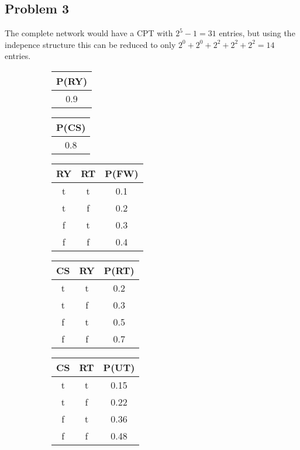 \documentclass[12pt, letterpaper]{article}
\begin{document}
\subsection{Problem 3}

The complete network would have a CPT with $2^5-1 = 31$ entries, but using
the indepence structure this can be reduced to only $2^0+2^0+2^2+2^2+2^2 = 14$ entries.

\begin{figure}[H]
  \begin{subfigure}[t]{0.5\textwidth}
    \centering\begin{tabular}[ct]{|c|}
      \hline
      P(RY) \\
      \hline
      0.9 \\
      \hline
    \end{tabular}
  \end{subfigure}
  \begin{subfigure}[t]{0.5\textwidth}
    \begin{tabular}[ct]{|c|}
      \hline
      P(CS) \\
      \hline
      0.8 \\
      \hline
    \end{tabular}
  \end{subfigure}
  \begin{subfigure}[t]{0.3\textwidth}
    \begin{tabular}[t]{|c|c|c|}
      \hline
      RY & RT & P(FW) \\
      \hline
      t & t & 0.1 \\
      t & f & 0.2 \\
      f & t & 0.3 \\
      f & f & 0.4 \\
      \hline
    \end{tabular}
  \end{subfigure}
  \begin{subfigure}[t]{0.3\textwidth}
    \begin{tabular}[t]{|c|c|c|}
      \hline
      CS & RY & P(RT) \\
      \hline
      t & t & 0.2 \\
      t & f & 0.3 \\
      f & t & 0.5 \\
      f & f & 0.7 \\
      \hline
    \end{tabular}
  \end{subfigure}
  \begin{subfigure}[t]{0.3\textwidth}
    \begin{tabular}[t]{|c|c|c|}
      \hline
      CS & RT & P(UT) \\
      \hline
      t & t & 0.15 \\
      t & f & 0.22 \\
      f & t & 0.36 \\
      f & f & 0.48 \\
      \hline
    \end{tabular}
  \end{subfigure}


\end{figure}
\end{document}
